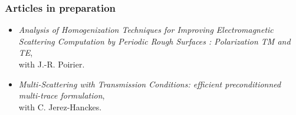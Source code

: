 \documentclass[a4paper,10pt,twoside]{article}
\begin{document}
\vspace{-0.65cm}

\subsubsection*{Articles in preparation}
\begin{itemize}
\item[\textbullet]
  \emph{Analysis of
    Homogenization Techniques for Improving Electromagnetic Scattering
  Computation by Periodic Rough Surfaces : Polarization TM and TE},\\
  with \textsf{J.-R. Poirier}.
\item[\textbullet]
  \emph{Multi-Scattering with Transmission Conditions: efficient
    preconditionned multi-trace formulation},\\
  with \textsf{C. Jerez-Hanckes}.
\end{itemize}

\vspace{-0.45cm}
\end{document}
